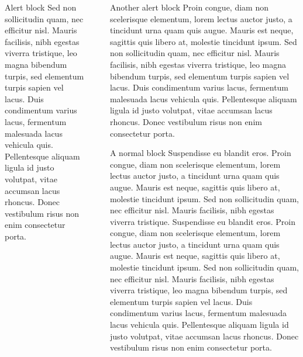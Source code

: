 \documentclass[final]{beamer}
\newlength{\sepwidth}
\newlength{\colwidth}
\newcommand{\separatorcolumn}{\begin{column}{\sepwidth}\end{column}}
\begin{document}
\begin{frame}[t]
\begin{columns}[t]
\begin{column}{\colwidth}
\begin{alertblock}{Alert block}
Sed non sollicitudin quam, nec efficitur nisl. Mauris facilisis, nibh egestas viverra tristique, leo magna bibendum turpis, sed elementum turpis sapien vel lacus. Duis condimentum varius lacus, fermentum malesuada lacus vehicula quis. Pellentesque aliquam ligula id justo volutpat, vitae accumsan lacus rhoncus. Donec vestibulum risus non enim consectetur porta. 

  \end{alertblock}


\end{column}

\separatorcolumn

\begin{column}{\colwidth}
\begin{alertblock}{Another alert block}
Proin congue, diam non scelerisque elementum, lorem lectus auctor justo, a tincidunt urna quam quis augue. Mauris est neque, sagittis quis libero at, molestie tincidunt ipsum. Sed non sollicitudin quam, nec efficitur nisl. Mauris facilisis, nibh egestas viverra tristique, leo magna bibendum turpis, sed elementum turpis sapien vel lacus. Duis condimentum varius lacus, fermentum malesuada lacus vehicula quis. Pellentesque aliquam ligula id justo volutpat, vitae accumsan lacus rhoncus. Donec vestibulum risus non enim consectetur porta. 

 
  \end{alertblock}
  \begin{block}{A normal block}
  Suspendisse eu blandit eros. Proin congue, diam non scelerisque elementum, lorem lectus auctor justo, a tincidunt urna quam quis augue. Mauris est neque, sagittis quis libero at, molestie tincidunt ipsum. Sed non sollicitudin quam, nec efficitur nisl. Mauris facilisis, nibh egestas viverra tristique.
  Suspendisse eu blandit eros. Proin congue, diam non scelerisque elementum, lorem lectus auctor justo, a tincidunt urna quam quis augue. Mauris est neque, sagittis quis libero at, molestie tincidunt ipsum. Sed non sollicitudin quam, nec efficitur nisl. Mauris facilisis, nibh egestas viverra tristique, leo magna bibendum turpis, sed elementum turpis sapien vel lacus. Duis condimentum varius lacus, fermentum malesuada lacus vehicula quis. Pellentesque aliquam ligula id justo volutpat, vitae accumsan lacus rhoncus. Donec vestibulum risus non enim consectetur porta. 
  

\end{block}
\end{column}
\end{columns}
\end{frame}
\end{document}
